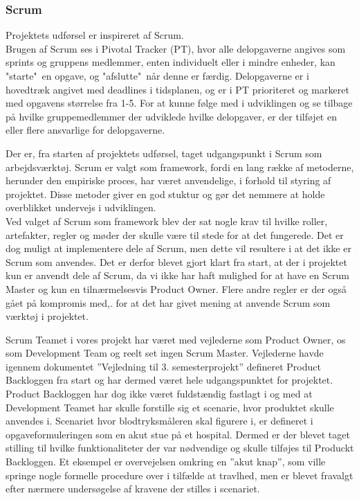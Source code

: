 \subsubsection{Scrum}
Projektets udførsel er inspireret af Scrum.\\
Brugen af Scrum ses i Pivotal Tracker (PT), hvor alle delopgaverne angives som sprints og gruppens medlemmer, enten individuelt eller i mindre enheder, kan "starte"\ en opgave, og "afslutte"\ når denne er færdig. Delopgaverne er i hovedtræk angivet med deadlines i tidsplanen, og er i PT prioriteret og markeret med opgavens størrelse fra 1-5. For at kunne følge med i udviklingen og se tilbage på hvilke gruppemedlemmer der udviklede hvilke delopgaver, er der tilføjet en eller flere ansvarlige for delopgaverne. 

Der er, fra starten af projektets udførsel, taget udgangspunkt i Scrum som arbejdsværktøj. Scrum er valgt som framework, fordi en lang række af metoderne, herunder den empiriske proces, har været anvendelige, i forhold til styring af projektet. Disse metoder giver en god stuktur og gør det nemmere at holde overblikket undervejs i udviklingen.\\
Ved valget af Scrum som framework blev der sat nogle krav til hvilke roller, artefakter, regler og møder der skulle være til stede for at det fungerede. 
Det er dog muligt at implementere dele af Scrum, men dette vil resultere i at det ikke er Scrum som anvendes. 
Det er derfor blevet gjort klart fra start, at der i projektet kun er anvendt dele af Scrum, da vi ikke har haft mulighed for at have en Scrum Master og kun en tilnærmelsesvis Product Owner.
Flere andre regler er der også gået på kompromis med,. for at det har givet mening at anvende Scrum som værktøj i projektet.

Scrum Teamet i vores projekt har været med vejlederne som Product Owner, os som Development Team  og reelt set ingen Scrum Master. 
Vejlederne havde igennem dokumentet ”Vejledning til 3. semesterprojekt” defineret Product Backloggen fra start og har dermed været hele udgangspunktet for projektet. 
Product Backloggen har dog ikke været fuldstændig fastlagt i og med at Development Teamet har skulle forstille sig et scenarie, hvor produktet skulle anvendes i. Scenariet hvor blodtryksmåleren skal figurere i, er defineret i opgaveformuleringen som en akut stue på et hospital. Dermed er der blevet taget stilling til hvilke funktionaliteter der var nødvendige og skulle tilføjes til Produckt Backloggen. Et eksempel er overvejelsen omkring en ”akut knap”, som ville springe nogle formelle procedure over i tilfælde at travlhed, men er blevet fravalgt efter nærmere undersøgelse af kravene der stilles i scenariet.

